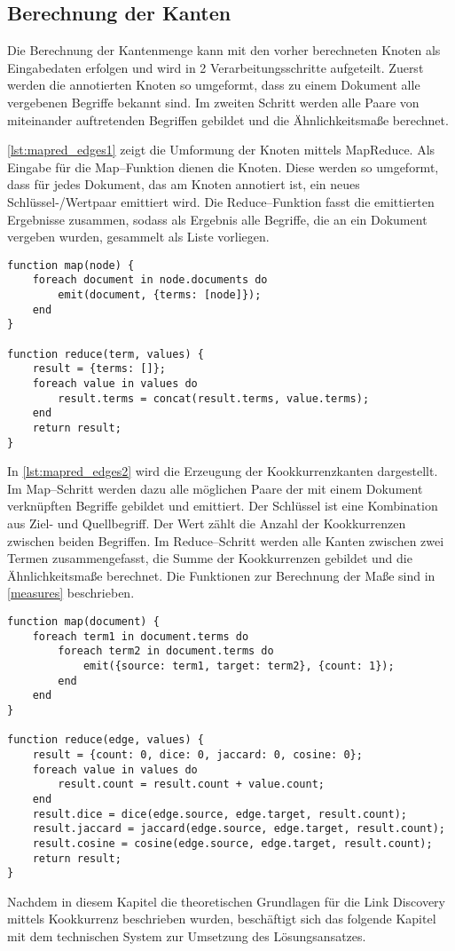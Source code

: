 \subsection{Berechnung der Kanten}

Die Berechnung der Kantenmenge kann mit den vorher berechneten Knoten als Eingabedaten erfolgen und wird in 2 Verarbeitungsschritte aufgeteilt. Zuerst werden die annotierten Knoten so umgeformt, dass zu einem Dokument alle vergebenen Begriffe bekannt sind. Im zweiten Schritt werden alle Paare von miteinander auftretenden Begriffen gebildet und die Ähnlichkeitsmaße berechnet.

\cref{lst:mapred_edges1} zeigt die Umformung der Knoten mittels MapReduce. Als Eingabe für die Map--Funktion dienen die Knoten. Diese werden so umgeformt, dass für jedes Dokument, das am Knoten annotiert ist, ein neues Schlüssel-/Wertpaar emittiert wird. Die Reduce--Funktion fasst die emittierten Ergebnisse zusammen, sodass als Ergebnis alle Begriffe, die an ein Dokument vergeben wurden, gesammelt als Liste vorliegen.

\begin{lstlisting}[language=pseudo, label={lst:mapred_edges1}, caption={Umformung der Knoten mit MapReduce}]
function map(node) {
    foreach document in node.documents do
        emit(document, {terms: [node]});
    end
}

function reduce(term, values) {
    result = {terms: []};
    foreach value in values do
        result.terms = concat(result.terms, value.terms);
    end
    return result;
}
\end{lstlisting}

In \cref{lst:mapred_edges2} wird die Erzeugung der Kookkurrenzkanten dargestellt. Im Map--Schritt werden dazu alle möglichen Paare der mit einem Dokument verknüpften Begriffe gebildet und emittiert. Der Schlüssel ist eine Kombination aus Ziel- und Quellbegriff. Der Wert zählt die Anzahl der Kookkurrenzen zwischen beiden Begriffen. Im Reduce--Schritt werden alle Kanten zwischen zwei Termen zusammengefasst, die Summe der Kookkurrenzen gebildet und die Ähnlichkeitsmaße berechnet. Die Funktionen zur Berechnung der Maße sind in \cref{measures} beschrieben.

\begin{lstlisting}[language=pseudo, label={lst:mapred_edges2}, caption={Kantenerzeugung mit MapReduce}]
function map(document) {
    foreach term1 in document.terms do
        foreach term2 in document.terms do
            emit({source: term1, target: term2}, {count: 1});
        end
    end
}

function reduce(edge, values) {
    result = {count: 0, dice: 0, jaccard: 0, cosine: 0};
    foreach value in values do
        result.count = result.count + value.count;
    end
    result.dice = dice(edge.source, edge.target, result.count);
    result.jaccard = jaccard(edge.source, edge.target, result.count);
    result.cosine = cosine(edge.source, edge.target, result.count);
    return result;
}
\end{lstlisting}

Nachdem in diesem Kapitel die theoretischen Grundlagen für die Link Discovery mittels Kookkurrenz beschrieben wurden, beschäftigt sich das folgende Kapitel mit dem technischen System zur Umsetzung des Lösungsansatzes.